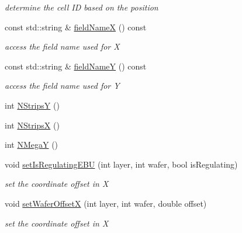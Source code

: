 \begin{DoxyCompactItemize}
\begin{DoxyCompactList}\small\item\em determine the cell ID based on the position \item\end{DoxyCompactList}\item 
const std::string \& \hyperlink{class_d_d4hep_1_1_d_d_segmentation_1_1_megatile_layer_grid_x_y_a15c6f89a44d2618eb41362e8467dd80c}{fieldNameX} () const 
\begin{DoxyCompactList}\small\item\em access the field name used for X \item\end{DoxyCompactList}\item 
const std::string \& \hyperlink{class_d_d4hep_1_1_d_d_segmentation_1_1_megatile_layer_grid_x_y_a5cd2d5c0487db9e75d56461d40178604}{fieldNameY} () const 
\begin{DoxyCompactList}\small\item\em access the field name used for Y \item\end{DoxyCompactList}\item 
int \hyperlink{class_d_d4hep_1_1_d_d_segmentation_1_1_megatile_layer_grid_x_y_a66306093675275c371f813c48fb39d70}{NStripsY} ()
\item 
int \hyperlink{class_d_d4hep_1_1_d_d_segmentation_1_1_megatile_layer_grid_x_y_a6004cfbffa52b347d04d12a0bd0657c0}{NStripsX} ()
\item 
int \hyperlink{class_d_d4hep_1_1_d_d_segmentation_1_1_megatile_layer_grid_x_y_ac5c3cbce77f0b432cc597689fab38c59}{NMegaY} ()
\item 
void \hyperlink{class_d_d4hep_1_1_d_d_segmentation_1_1_megatile_layer_grid_x_y_a7d696e7cba091370935d23b62c79ae9c}{setIsRegulatingEBU} (int layer, int wafer, bool isRegulating)
\begin{DoxyCompactList}\small\item\em set the coordinate offset in X \item\end{DoxyCompactList}\item 
void \hyperlink{class_d_d4hep_1_1_d_d_segmentation_1_1_megatile_layer_grid_x_y_a8683c7d9ed5d4b02f79748d1bb16d935}{setWaferOffsetX} (int layer, int wafer, double offset)
\begin{DoxyCompactList}\small\item\em set the coordinate offset in X \item\end{DoxyCompactList}\item 

\end{DoxyCompactItemize}
